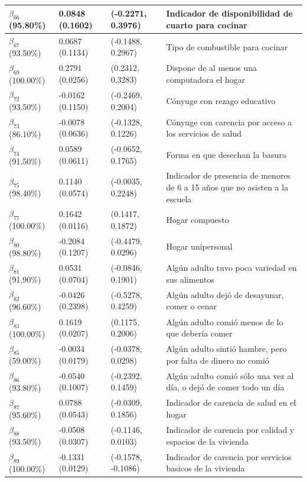 \documentclass[11pt]{article}
\begin{document}
\begin{table}[H]
\begin{tabular}[t]{l|l|l|l}
\hline
$\beta_{66}$ (95.80\%) & 0.0848 (0.1602) & (-0.2271, 0.3976) & Indicador de disponibilidad de cuarto para cocinar\\
\hline
$\beta_{67}$ (93.50\%) & 0.0687 (0.1134) & (-0.1488, 0.2967) & Tipo de combustible para cocinar\\
\hline
$\beta_{69}$ (100.00\%) & 0.2791 (0.0256) & (0.2312, 0.3283) & Dispone de al menos una computadora el hogar\\
\hline
$\beta_{72}$ (93.50\%) & -0.0162 (0.1150) & (-0.2469, 0.2004) & Cónyuge con rezago educativo\\
\hline
$\beta_{73}$ (86.10\%) & -0.0078 (0.0636) & (-0.1328, 0.1226) & Cónyuge con carencia por acceso a los servicios de salud\\
\hline
$\beta_{74}$ (91.50\%) & 0.0589 (0.0611) & (-0.0652, 0.1765) & Forma en que desechan la basura\\
\hline
$\beta_{75}$ (98.40\%) & 0.1140 (0.0574) & (-0.0035, 0.2248) & Indicador de presencia de menores de 6 a 15 años que no asisten a la escuela\\
\hline
$\beta_{77}$ (100.00\%) & 0.1642 (0.0116) & (0.1417, 0.1872) & Hogar compuesto\\
\hline
$\beta_{80}$ (98.80\%) & -0.2084 (0.1207) & (-0.4479, 0.0296) & Hogar unipersonal\\
\hline
$\beta_{81}$ (91.90\%) & 0.0531 (0.0704) & (-0.0846, 0.1901) & Algún adulto tuvo poca variedad en sus alimentos\\
\hline
$\beta_{82}$ (96.60\%) & -0.0426 (0.2398) & (-0.5278, 0.4259) & Algún adulto dejó de desayunar, comer o cenar\\
\hline
$\beta_{83}$ (100.00\%) & 0.1619 (0.0207) & (0.1175, 0.2006) & Algún adulto comió menos de lo que debería comer\\
\hline
$\beta_{85}$ (59.00\%) & -0.0034 (0.0179) & (-0.0378, 0.0298) & Algún adulto sintió hambre, pero por falta de dinero no comió\\
\hline
$\beta_{86}$ (93.80\%) & -0.0540 (0.1007) & (-0.2392, 0.1459) & Algún adulto comió sólo una vez al día, o dejó de comer todo un día\\
\hline
$\beta_{87}$ (95.60\%) & 0.0788 (0.0543) & (-0.0309, 0.1856) & Indicador de carencia de salud en el hogar\\
\hline
$\beta_{88}$ (93.50\%) & -0.0508 (0.0307) & (-0.1146, 0.0103) & Indicador de carencia por calidad y espacios de la vivienda\\
\hline
$\beta_{89}$ (100.00\%) & -0.1331 (0.0129) & (-0.1578, -0.1086) & Indicador de carencia por servicios basicos de la vivienda\\

\end{tabular}
\end{table}
\end{document}
